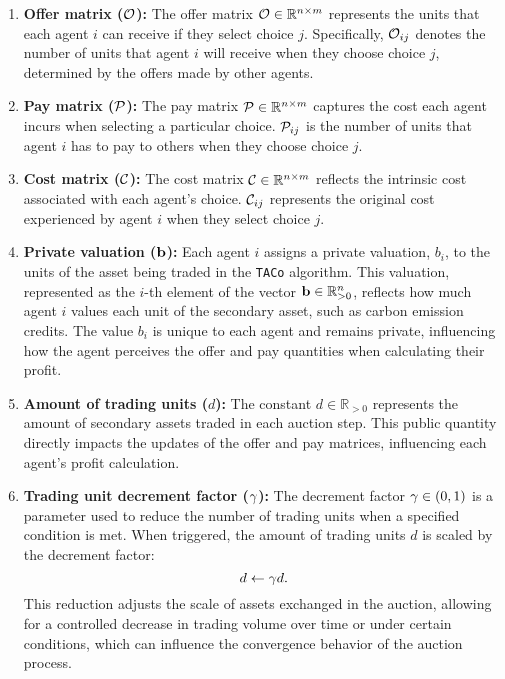 \begin{enumerate}[\hspace{0pt}1)]
    \item \textbf{Offer matrix ($\mathcal{O}$):} The offer matrix $\mathcal{O} \in \mathbb{R}^{n \times m}$ represents the units that each agent $i$ can receive if they select choice $j$. Specifically, $\mathcal{O}_{ij}$  denotes the number of units that agent $i$ will receive when they choose choice $j$, determined by the offers made by other agents.
    
    \item \textbf{Pay matrix ($\mathcal{P}$):} The pay matrix $\mathcal{P} \in \mathbb{R}^{n \times m}$ captures the cost each agent incurs when selecting a particular choice. $\mathcal{P}_{ij}$ is the number of units that agent $i$ has to pay to others when they choose choice $j$.
    
    \item \textbf{Cost matrix ($\mathcal{C}$):} The cost matrix $\mathcal{C} \in \mathbb{R}^{n \times m}$ reflects the intrinsic cost associated with each agent's choice. $\mathcal{C}_{ij}$ represents the original cost experienced by agent $i$ when they select choice $j$.
    
    \item \textbf{Private valuation ($\mathbf{b}$):} Each agent $i$ assigns a private valuation, $b_i$, to the units of the asset being traded in the \texttt{TACo} algorithm. This valuation, represented as the $i$-th element of the vector $\mathbf{b} \in \mathbb{R}_{>0}^n$, reflects how much agent $i$ values each unit of the secondary asset, such as carbon emission credits. The value $b_i$ is unique to each agent and remains private, influencing how the agent perceives the offer and pay quantities when calculating their profit.
    \item \textbf{Amount of trading units ($d$):} The constant $d \in \mathbb{R}_{>0}$ represents the amount of secondary assets traded in each auction step. This public quantity directly impacts the updates of the offer and pay matrices, influencing each agent's profit calculation.
    \item \textbf{Trading unit decrement factor ($\gamma$):} The decrement factor $\gamma \in (0,1)$ is a parameter used to reduce the number of trading units when a specified condition is met. When triggered, the amount of trading units $d$ is scaled by the decrement factor:
    \begin{equation}
    d \leftarrow \gamma d.
    \end{equation}
    This reduction adjusts the scale of assets exchanged in the auction, allowing for a controlled decrease in trading volume over time or under certain conditions, which can influence the convergence behavior of the auction process.
    

\end{enumerate}

